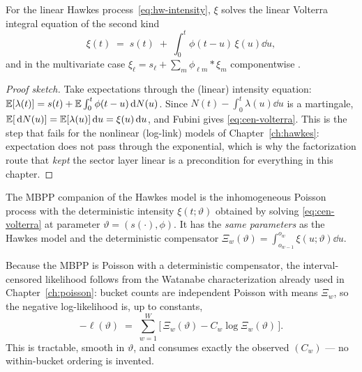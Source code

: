 \begin{proposition}
\label{prop:cen-volterra}
For the linear Hawkes process~\eqref{eq:hw-intensity}, $\xi$ solves the linear Volterra
integral equation of the second kind
\begin{equation}
\label{eq:cen-volterra}
\xi(t) \;=\; s(t) \;+\; \int_0^t \phi(t-u)\, \xi(u) \dd u ,
\end{equation}
and in the multivariate case $\xi_\ell = s_\ell + \sum_m \phi_{\ell m} * \xi_m$
componentwise \cite{bacry2015}.
\end{proposition}

\begin{proof}[Proof sketch]
Take expectations through the (linear) intensity equation:
$\mathbb{E}[\lambda(t)] = s(t) + \mathbb{E} \int_0^t \phi(t-u) \,\mathrm{d} N(u)$. Since $N(t) - \int_0^t
\lambda(u)\dd u$ is a martingale, $\mathbb{E}[\,\mathrm{d} N(u)] = \mathbb{E}[\lambda(u)]\,\mathrm{d} u = \xi(u)\,\mathrm{d} u$, and
Fubini gives \eqref{eq:cen-volterra}. This is the step that fails for the nonlinear
(log-link) models of Chapter~\ref{ch:hawkes}: expectation does not pass through the
exponential, which is why the factorization route that \emph{kept} the sector layer linear
is a precondition for everything in this chapter.
\end{proof}

\begin{definition}
\label{def:cen-mbpp}
The MBPP companion of the Hawkes model is the inhomogeneous Poisson process with the
deterministic intensity $\xi(t; \vartheta)$ obtained by solving \eqref{eq:cen-volterra}
at parameter $\vartheta = (s(\cdot), \phi)$. It has the \emph{same parameters} as the
Hawkes model and the deterministic compensator
$\Xi_w(\vartheta) = \int_{o_{w-1}}^{o_w} \xi(u;\vartheta) \dd u$.
\end{definition}

Because the MBPP is Poisson with a deterministic compensator, the interval-censored
likelihood follows from the Watanabe characterization already used in
Chapter~\ref{ch:poisson}: bucket counts are independent Poisson with means $\Xi_w$, so the
negative log-likelihood is, up to constants,
\begin{equation}
\label{eq:cen-lik}
-\ell(\vartheta) \;=\; \sum_{w=1}^{W} \bigl[\, \Xi_w(\vartheta) - C_w \log
\Xi_w(\vartheta) \,\bigr].
\end{equation}
This is tractable, smooth in $\vartheta$, and consumes exactly the observed
$(C_w)$ --- no within-bucket ordering is invented.

